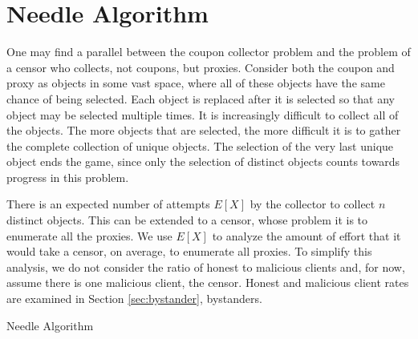 \chapter{Needle Algorithm}
\label{sec:analysis}

One may find a parallel between the coupon collector problem and the problem of a censor who collects, not coupons, but proxies. Consider both the coupon and proxy as objects in some vast space, where all of these objects have the same chance of being selected. Each object is replaced after it is selected so that any object may be selected multiple times. It is increasingly difficult to collect all of the objects. The more objects that are selected, the more difficult it is to gather the complete collection of unique objects. The selection of the very last unique object ends the game, since only the selection of distinct objects counts towards progress in this problem.

There is an expected number of attempts $E[X]$ by the collector to collect $n$ distinct objects. This can be extended to a censor, whose problem it is to enumerate all the proxies. We use $E[X]$ to analyze the amount of effort that it would take a censor, on average, to enumerate all proxies. To simplify this analysis, we do not consider the ratio of honest to malicious clients and, for now, assume there is one malicious client, the censor. Honest and malicious client rates are examined in Section \ref{sec:bystander}, bystanders.

\begin{algorithm}[t]
\DontPrintSemicolon
{}
\caption{Needle Algorithm \label{needle}}
\end{algorithm}


